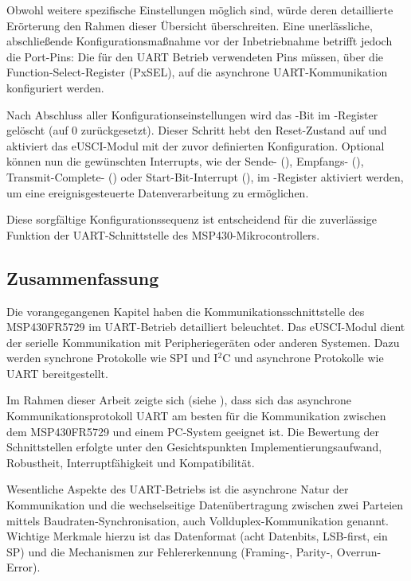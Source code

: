 Obwohl weitere spezifische Einstellungen m\"oglich sind, w\"urde deren detaillierte Er\"orterung den Rahmen dieser \"Ubersicht \"uberschreiten. Eine unerl\"assliche, abschließende Konfigurationsmaßnahme vor der Inbetriebnahme betrifft jedoch die Port-Pins: Die f\"ur den UART Betrieb verwendeten Pins m\"ussen, \"uber die Function-Select-Register (PxSEL), auf die asynchrone UART-Kommunikation konfiguriert werden. 

Nach Abschluss aller Konfigurationseinstellungen wird das -Bit im -Register gel\"oscht (auf 0 zur\"uckgesetzt). Dieser Schritt hebt den Reset-Zustand auf und aktiviert das eUSCI-Modul mit der zuvor definierten Konfiguration. Optional k\"onnen nun die gew\"unschten Interrupts, wie \zB der Sende- (), Empfangs- (), Transmit-Complete- () oder Start-Bit-Interrupt (), im -Register aktiviert werden, um eine ereignisgesteuerte Datenverarbeitung zu erm\"oglichen. 
	
Diese sorgf\"altige Konfigurationssequenz ist entscheidend f\"ur die zuverl\"assige Funktion der UART-Schnittstelle des MSP430-Mikrocontrollers.

\subsection{Zusammenfassung}
\label{sec:eUSCI_Zusammenfassung}

Die vorangegangenen Kapitel haben die Kommunikationsschnittstelle des MSP430FR5729 im UART-Betrieb detailliert beleuchtet. Das eUSCI-Modul dient der serielle Kommunikation mit Peripherieger\"aten oder anderen Systemen. Dazu werden synchrone Protokolle wie SPI und I$^{2}$C und asynchrone Protokolle wie UART bereitgestellt.

Im Rahmen dieser Arbeit zeigte sich (siehe ), dass sich das asynchrone Kommunikationsprotokoll UART am besten f\"ur die Kommunikation zwischen dem MSP430FR5729 und einem PC-System geeignet ist. Die Bewertung der Schnittstellen erfolgte unter den Gesichtspunkten Implementierungsaufwand, Robustheit, Interruptf\"ahigkeit und Kompatibilit\"at.

Wesentliche Aspekte des UART-Betriebs ist die asynchrone Natur der Kommunikation und die wechselseitige Daten\"ubertragung zwischen zwei Parteien mittels Baudraten-Synchronisation, auch Vollduplex-Kommunikation genannt. Wichtige Merkmale hierzu ist das Datenformat (\zB acht Datenbits, LSB-first, ein SP) und die Mechanismen zur Fehlererkennung (\zB Framing-, Parity-, Overrun-Error).

